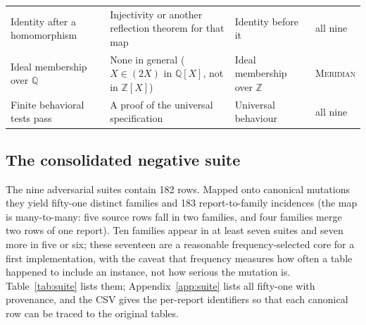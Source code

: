 \documentclass[11pt,a4paper]{article}
\newcommand{\Md}{\textsc{Meridian}}
\newcommand{\Z}{\mathbb Z}
\newcommand{\Q}{\mathbb Q}
\theoremstyle{definition}
\begin{document}
\begin{table}[htbp]
\begin{tabularx}{\textwidth}{@{}L{31mm}YL{40mm}L{22mm}@{}}
Identity after a homomorphism & Injectivity or another reflection theorem for that map & Identity before it & all nine\\
Ideal membership over $\Q$ & None in general ($X\in(2X)$ in $\Q[X]$, not in $\Z[X]$) & Ideal membership over $\Z$ & \Md\\
Finite behavioral tests pass & A proof of the universal specification & Universal behaviour & all nine\\
\bottomrule
\end{tabularx}
\end{table}

\subsection{The consolidated negative suite}\label{sec:suite}
The nine adversarial suites contain 182 rows. Mapped onto canonical mutations they yield fifty-one distinct families and 183 report-to-family incidences (the map is many-to-many: five source rows fall in two families, and four families merge two rows of one report). Ten families appear in at least seven suites and seven more in five or six; these seventeen are a reasonable frequency-selected core for a first implementation, with the caveat that frequency measures how often a table happened to include an instance, not how serious the mutation is. Table~\ref{tab:suite} lists them; Appendix~\ref{app:suite} lists all fifty-one with provenance, and the CSV gives the per-report identifiers so that each canonical row can be traced to the original tables.
\end{document}
